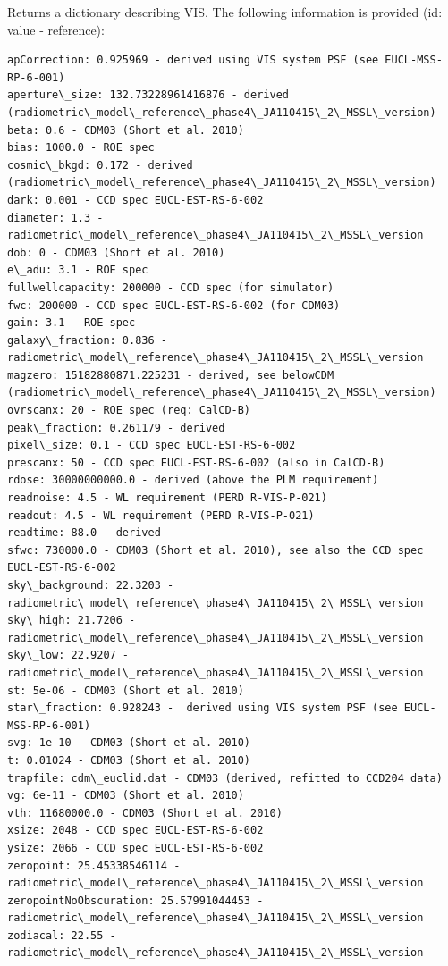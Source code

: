 \documentclass[a4paper,11pt,english]{sphinxmanual}
\begin{document}
\begin{fulllineitems}
\label{instrument:support.VISinstrumentModel.VISinformation}
Returns a dictionary describing VIS. The following information is provided (id: value - reference):

\begin{Verbatim}[commandchars=\\\{\}]
apCorrection: 0.925969 - derived using VIS system PSF (see EUCL-MSS-RP-6-001)
aperture\_size: 132.73228961416876 - derived (radiometric\_model\_reference\_phase4\_JA110415\_2\_MSSL\_version)
beta: 0.6 - CDM03 (Short et al. 2010)
bias: 1000.0 - ROE spec
cosmic\_bkgd: 0.172 - derived  (radiometric\_model\_reference\_phase4\_JA110415\_2\_MSSL\_version)
dark: 0.001 - CCD spec EUCL-EST-RS-6-002
diameter: 1.3 - radiometric\_model\_reference\_phase4\_JA110415\_2\_MSSL\_version
dob: 0 - CDM03 (Short et al. 2010)
e\_adu: 3.1 - ROE spec
fullwellcapacity: 200000 - CCD spec (for simulator)
fwc: 200000 - CCD spec EUCL-EST-RS-6-002 (for CDM03)
gain: 3.1 - ROE spec
galaxy\_fraction: 0.836 - radiometric\_model\_reference\_phase4\_JA110415\_2\_MSSL\_version
magzero: 15182880871.225231 - derived, see belowCDM (radiometric\_model\_reference\_phase4\_JA110415\_2\_MSSL\_version)
ovrscanx: 20 - ROE spec (req: CalCD-B)
peak\_fraction: 0.261179 - derived
pixel\_size: 0.1 - CCD spec EUCL-EST-RS-6-002
prescanx: 50 - CCD spec EUCL-EST-RS-6-002 (also in CalCD-B)
rdose: 30000000000.0 - derived (above the PLM requirement)
readnoise: 4.5 - WL requirement (PERD R-VIS-P-021)
readout: 4.5 - WL requirement (PERD R-VIS-P-021)
readtime: 88.0 - derived
sfwc: 730000.0 - CDM03 (Short et al. 2010), see also the CCD spec EUCL-EST-RS-6-002
sky\_background: 22.3203 - radiometric\_model\_reference\_phase4\_JA110415\_2\_MSSL\_version
sky\_high: 21.7206 - radiometric\_model\_reference\_phase4\_JA110415\_2\_MSSL\_version
sky\_low: 22.9207 - radiometric\_model\_reference\_phase4\_JA110415\_2\_MSSL\_version
st: 5e-06 - CDM03 (Short et al. 2010)
star\_fraction: 0.928243 -  derived using VIS system PSF (see EUCL-MSS-RP-6-001)
svg: 1e-10 - CDM03 (Short et al. 2010)
t: 0.01024 - CDM03 (Short et al. 2010)
trapfile: cdm\_euclid.dat - CDM03 (derived, refitted to CCD204 data)
vg: 6e-11 - CDM03 (Short et al. 2010)
vth: 11680000.0 - CDM03 (Short et al. 2010)
xsize: 2048 - CCD spec EUCL-EST-RS-6-002
ysize: 2066 - CCD spec EUCL-EST-RS-6-002
zeropoint: 25.45338546114 - radiometric\_model\_reference\_phase4\_JA110415\_2\_MSSL\_version
zeropointNoObscuration: 25.57991044453 - radiometric\_model\_reference\_phase4\_JA110415\_2\_MSSL\_version
zodiacal: 22.55 - radiometric\_model\_reference\_phase4\_JA110415\_2\_MSSL\_version
\end{Verbatim}


\end{fulllineitems}
\end{document}
